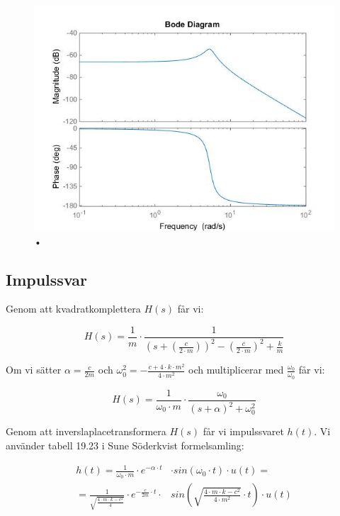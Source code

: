 \documentclass[10pt,a4paper]{article}
\begin{document}
\begin{figure}[h]
\begin{center}
\includegraphics[scale=0.5]{BodePlot(FasAmpKar)}
\caption{•}
\end{center}
\end{figure}




\newpage
\subsection{Impulssvar}

Genom att kvadratkomplettera $H(s)$ får vi:

\begin{equation}
H(s) = \frac{1}{m} \cdot \frac{1}{(s+(\frac{c}{2 \cdot m}))^2-(\frac{c}{2 \cdot m})^2+\frac{k}{m}} 
\end{equation}

Om vi sätter $\alpha = \frac{c}{2m}$ och $\omega_0^2 = {-\frac{c + 4\cdot k \cdot m^2}{4 \cdot m^2}}$ och multiplicerar med $\frac{\omega_0}{\omega_0}$ får vi:

\begin{equation}
H(s) = \frac{1}{\omega_0 \cdot m} \cdot \frac{\omega_0}{(s + \alpha)^2 +\omega_0^2}
\end{equation}

Genom att inverslaplacetransformera $H(s)$ får vi impulssvaret $h(t)$. Vi använder tabell 19.23 i Sune Söderkvist formelsamling:

\begin{equation}
\begin{split}
h(t) = \frac{1}{\omega_0 \cdot m} \cdot e^{-\alpha \cdot t} & \cdot sin(\omega_0 \cdot t) \cdot u(t) = \\ = \frac{1}{\sqrt{\frac{4 \cdot m \cdot k - c^2}{4}} }  \cdot e^{-\frac{c}{2m} \cdot t} \cdot & sin(\sqrt{\frac{4 \cdot m \cdot k - c^2}{4 \cdot m^2}} \cdot t) \cdot u(t)
\end{split}
\end{equation}
\end{document}
